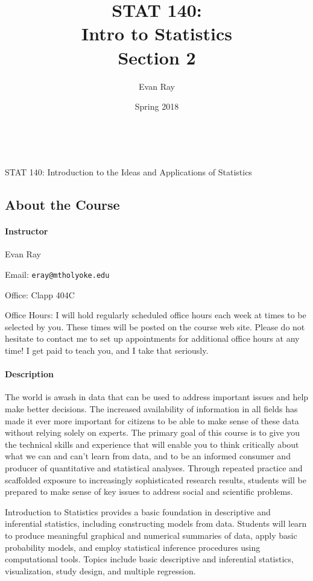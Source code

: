 \documentclass[11pt]{article}
\title{STAT 140:\\Intro to Statistics\\Section 2}
\author{Evan Ray}
\date{Spring 2018}
\begin{document}

\ \\
\vspace{.01in}
\begin{center}
{\large STAT 140: Introduction to the Ideas and Applications of Statistics}
\end{center}
\subsection*{About the Course}

\paragraph{Instructor}

Evan Ray

Email: \texttt{eray@mtholyoke.edu}

Office: Clapp 404C

Office Hours: I will hold regularly scheduled office hours each week at times to be selected by you.  These times will be posted on the course web site.  Please do not hesitate to contact me to set up appointments for additional office hours at any time!  I get paid to teach you, and I take that seriously.

\paragraph{Description}

The world is awash in data that can be used to address important issues and help make better decisions.  The increased availability of information in all fields has made it ever more important for citizens to be able to make sense of these data without relying solely on experts.  The primary goal of this course is to give you the technical skills and experience that will enable you to think critically about what we can and can't learn from data, and to be an informed consumer and producer of quantitative and statistical analyses.  Through repeated practice and scaffolded exposure to increasingly sophisticated research results, students will be prepared to make sense of key issues to address social and scientific problems.

Introduction to Statistics provides a basic foundation in descriptive and inferential statistics, including constructing models from data. Students will learn to produce meaningful graphical and numerical summaries of data, apply basic probability models, and employ statistical inference procedures using computational tools. Topics include basic descriptive and inferential statistics, visualization, study design, and multiple regression.
\end{document}
